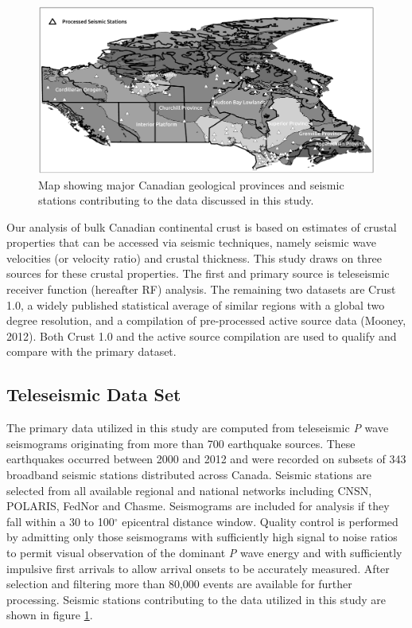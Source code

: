 \documentclass[review]{elsarticle}
\begin{document}
\begin{figure}
  \centering
  \includegraphics[width=\textwidth]{stationMap.pdf}
  \caption{Map showing major Canadian geological provinces and seismic stations contributing to the data discussed in this study.}
  \label{map:stationMap}
\end{figure}


Our analysis of bulk Canadian continental crust is based on estimates of crustal properties that can be accessed via seismic techniques, namely seismic wave velocities (or velocity ratio) and crustal thickness. This study draws on three sources for these crustal properties. The first and primary source is teleseismic receiver function (hereafter RF) analysis. The remaining two datasets are Crust 1.0, a widely published statistical average of similar regions with a global two degree resolution, and a compilation of pre-processed active source data (Mooney, 2012). Both Crust 1.0 and the active source compilation are used to qualify and compare with the primary dataset.




\subsection{Teleseismic Data Set}
The primary data utilized in this study are computed from teleseismic {\it P} wave seismograms originating from more than 700 earthquake sources. These earthquakes occurred between 2000 and 2012 and were recorded on subsets of 343 broadband seismic stations distributed across Canada. Seismic stations are selected from all available regional and national networks including CNSN, POLARIS, FedNor and Chasme. Seismograms are included for analysis if they fall within a 30 to 100$^\circ$ epicentral distance window. Quality control is performed by admitting only those seismograms with sufficiently high signal to noise ratios to permit visual observation of the dominant {\it P} wave energy and with sufficiently impulsive first arrivals to allow arrival onsets to be accurately measured. After selection and filtering more than 80,000 events are available for further processing. Seismic stations contributing to the data utilized in this study are shown in figure \ref{map:stationMap}.
\end{document}
